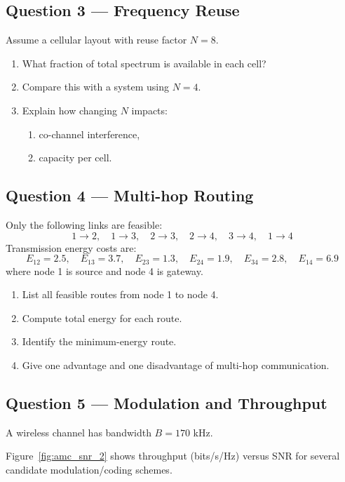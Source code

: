 \documentclass[11pt,a4paper]{article}
\begin{document}
\subsection*{Question 3 --- Frequency Reuse}
Assume a cellular layout with reuse factor $N=8$.

\begin{enumerate}[label=\alph*)]
    \item What fraction of total spectrum is available in each cell?
    \item Compare this with a system using $N=4$.
    \item Explain how changing $N$ impacts:
    \begin{enumerate}[label=\roman*)]
        \item co-channel interference,
        \item capacity per cell.
    \end{enumerate}
\end{enumerate}

\subsection*{Question 4 --- Multi-hop Routing}
Only the following links are feasible:
\[
1 \rightarrow 2,\quad 1 \rightarrow 3,\quad 2 \rightarrow 3,\quad 2 \rightarrow 4,\quad 3 \rightarrow 4,\quad 1 \rightarrow 4
\]
Transmission energy costs are:
\[
E_{12}=2.5,\quad E_{13}=3.7,\quad E_{23}=1.3,\quad E_{24}=1.9,\quad E_{34}=2.8,\quad E_{14}=6.9
\]
where node 1 is source and node 4 is gateway.

\begin{enumerate}[label=\alph*)]
    \item List all feasible routes from node 1 to node 4.
    \item Compute total energy for each route.
    \item Identify the minimum-energy route.
    \item Give one advantage and one disadvantage of multi-hop communication.
\end{enumerate}

\subsection*{Question 5 --- Modulation and Throughput}
A wireless channel has bandwidth $B = 170$ kHz.

Figure~\ref{fig:amc_snr_2} shows throughput (bits/s/Hz) versus SNR for several candidate modulation/coding schemes.

\FloatBarrier
\end{document}

